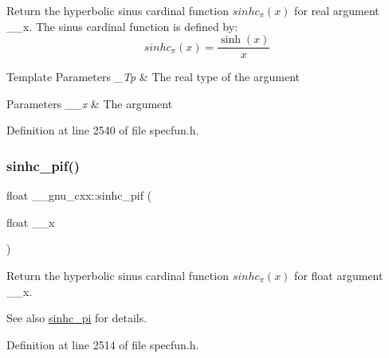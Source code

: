 Return the hyperbolic sinus cardinal function $ sinhc_\pi(x) $ for real argument {\ttfamily \+\_\+\+\_\+x}. The sinus cardinal function is defined by\+: \[ sinhc_\pi(x) = \frac{\sinh(x)}{x} \]


\begin{DoxyTemplParams}{Template Parameters}
{\em \+\_\+\+Tp} & The real type of the argument \\
\hline
\end{DoxyTemplParams}

\begin{DoxyParams}{Parameters}
{\em \+\_\+\+\_\+x} & The argument \\
\hline
\end{DoxyParams}


Definition at line 2540 of file specfun.\+h.

\mbox{\label{group__mathsf__gnu_ga26e54504db6541550266140f5264acbe}} 
\subsubsection{\texorpdfstring{sinhc\+\_\+pif()}{sinhc\_pif()}}
{\footnotesize\ttfamily float \+\_\+\+\_\+gnu\+\_\+cxx\+::sinhc\+\_\+pif (\begin{DoxyParamCaption}\item[{float}]{\+\_\+\+\_\+x }\end{DoxyParamCaption})\hspace{0.3cm}{\ttfamily [inline]}}

Return the hyperbolic sinus cardinal function $ sinhc_\pi(x) $ for {\ttfamily float} argument {\ttfamily \+\_\+\+\_\+x}.

\begin{DoxySeeAlso}{See also}
\hyperlink{group__mathsf__gnu_ga8bb6034e28d48879845bf64818cc06e1}{sinhc\+\_\+pi} for details. 
\end{DoxySeeAlso}


Definition at line 2514 of file specfun.\+h.

\mbox{\label{group__mathsf__gnu_gaa572bf7633f457c86cef65bfd6ec4ad9}} 
